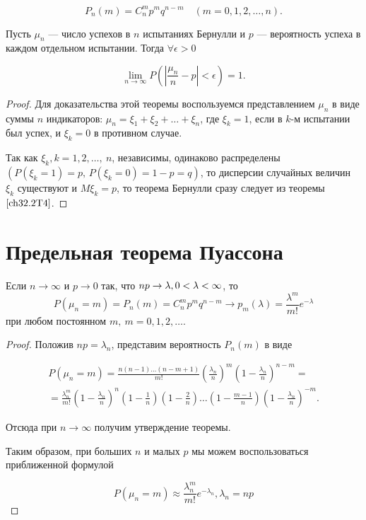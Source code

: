 \begin{equation} \label{ch32.1.1eq1}
P_n(m) = C_n^m p^mq^{n - m} \quad (m = 0,1,2,\ldots,n).
\end{equation}

\begin{thm} [Бернулли]
Пусть $\mu_n$ --- число успехов в $n$ испытаниях Бернулли и $p$ --- вероятность успеха в каждом отдельном испытании. Тогда $\forall \epsilon > 0$

\begin{equation} \label{ch32.2eq7}
\lim_{n \to \infty} P \left( \left| \frac{\mu_n}{n} - p \right| < \epsilon \right) = 1.
\end{equation}
\end{thm}

\begin{proof}
Для доказательства этой теоремы воспользуемся представлением $\mu_n$ в виде суммы $n$ индикаторов: $\mu_n = \xi_1 + \xi_2 + \ldots + \xi_n$, где $\xi_k = 1$, если в $k$-м испытании был успех, и $\xi_k  = 0$ в противном случае.

Так как $\xi_k, k = 1,2,\ldots, \: n$, независимы, одинаково распределены $(P( \xi_k = 1) = p, \,P( \xi_k = 0) = 1 - p = q)$, то дисперсии случайных величин $\xi_k$ существуют и $M  \xi_k = p$, то теорема Бернулли сразу следует из теоремы $\ref{ch32.2T4}$.
\end{proof}



\section{Предельная теорема Пуассона}
\begin{thm} [Пуассона]
Если $n \to \infty$ и $p \to 0$ так, что $np \to \lambda, \:\\ 0 < \lambda < \infty$, то
$$
P(\mu_n = m) = P_n(m) = C_n^m p^mq^{n - m} \to p_m(\lambda) = \frac{\lambda^m}{m!} e^{-\lambda}
$$
при любом постоянном $m, \: m = 0,1,2,\dots$.
\end{thm}

\begin{proof}
Положив $np = \lambda_n$, представим вероятность $P_n(m)$ в виде

\begin{multline*}
P(\mu_n = m) = \frac{n(n - 1)\ldots(n - m + 1)}{m!} \left( \frac{\lambda_n}{n}\right)^m\left( 1 - \frac{\lambda_n}{n}\right)^{n - m} = \\
= \frac{\lambda_n^m}{m!} \left( 1 - \frac{\lambda_n}{n}\right)^n \left( 1 - \frac{1}{n}\right)\left(1 - \frac{2}{n} \right) \ldots \left( 1 - \frac{m - 1}{n}\right)\left(1 - \frac{\lambda_n}{n} \right)^{-m}.
\end{multline*}

Отсюда при $n \to \infty$ получим утверждение теоремы.

Таким образом, при больших $n$ и малых $p$ мы можем воспользоваться приближенной формулой

$$
P(\mu_n = m) \approx \frac{\lambda_n^m}{m!} e^{-\lambda_n},	\lambda_n = np
$$
\end{proof}